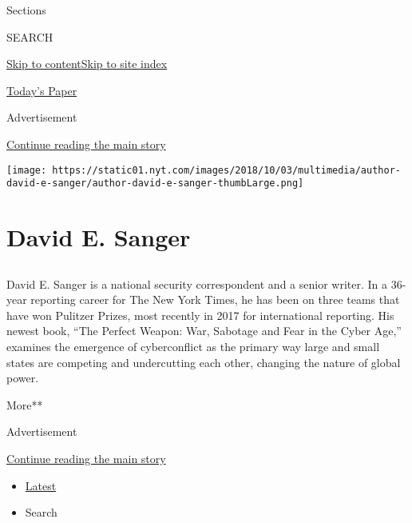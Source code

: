 Sections

SEARCH

\protect\hyperlink{site-content}{Skip to
content}\protect\hyperlink{site-index}{Skip to site index}

\href{https://myaccount.nytimes.com/auth/login?response_type=cookie\&client_id=vi}{}

\href{https://www.nytimes.com/section/todayspaper}{Today's Paper}

Advertisement

\protect\hyperlink{after-top}{Continue reading the main story}

\texttt{[image: https://static01.nyt.com/images/2018/10/03/multimedia/author-david-e-sanger/author-david-e-sanger-thumbLarge.png]}

\hypertarget{david-e-sanger}{%
\section{David E. Sanger}\label{david-e-sanger}}

\subsection{}

David E. Sanger is a national security correspondent and a senior
writer. In a 36-year reporting career for The New York Times, he has
been on three teams that have won Pulitzer Prizes, most recently in 2017
for international reporting. His newest book, ``The Perfect Weapon: War,
Sabotage and Fear in the Cyber Age,'' examines the emergence of
cyberconflict as the primary way large and small states are competing
and undercutting each other, changing the nature of global power.

More**

Advertisement

\protect\hyperlink{after-mid1}{Continue reading the main story}

\begin{itemize}
\tightlist
\item
  \protect\hyperlink{stream-panel}{Latest}
\item
  Search
\end{itemize}

